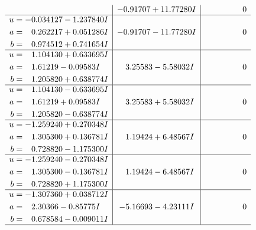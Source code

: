 \documentclass[1p]{elsarticle_modified}
\theoremstyle{definition}
\begin{document}
$$\begin{array}{c|c|c}
 & -0.91707 + 11.77280 I & \phantom{-0.000000 } 0 \\ \hline\begin{aligned}
u &= -0.034127 - 1.237840 I \\
a &= \phantom{-}0.262217 + 0.051286 I \\
b &= \phantom{-}0.974512 + 0.741654 I\end{aligned}
 & -0.91707 - 11.77280 I & \phantom{-0.000000 } 0 \\ \hline\begin{aligned}
u &= \phantom{-}1.104130 + 0.633695 I \\
a &= \phantom{-}1.61219 - 0.09583 I \\
b &= \phantom{-}1.205820 + 0.638774 I\end{aligned}
 & \phantom{-}3.25583 - 5.58032 I & \phantom{-0.000000 } 0 \\ \hline\begin{aligned}
u &= \phantom{-}1.104130 - 0.633695 I \\
a &= \phantom{-}1.61219 + 0.09583 I \\
b &= \phantom{-}1.205820 - 0.638774 I\end{aligned}
 & \phantom{-}3.25583 + 5.58032 I & \phantom{-0.000000 } 0 \\ \hline\begin{aligned}
u &= -1.259240 + 0.270348 I \\
a &= \phantom{-}1.305300 + 0.136781 I \\
b &= \phantom{-}0.728820 - 1.175300 I\end{aligned}
 & \phantom{-}1.19424 + 6.48567 I & \phantom{-0.000000 } 0 \\ \hline\begin{aligned}
u &= -1.259240 - 0.270348 I \\
a &= \phantom{-}1.305300 - 0.136781 I \\
b &= \phantom{-}0.728820 + 1.175300 I\end{aligned}
 & \phantom{-}1.19424 - 6.48567 I & \phantom{-0.000000 } 0 \\ \hline\begin{aligned}
u &= -1.307360 + 0.038712 I \\
a &= \phantom{-}2.30366 - 0.85775 I \\
b &= \phantom{-}0.678584 - 0.009011 I\end{aligned}
 & -5.16693 - 4.23111 I & \phantom{-0.000000 } 0\\
 \hline 
 \end{array}$$\newpage$$\begin{array}{c|c|c}  

\end{array}$$
\end{document}
